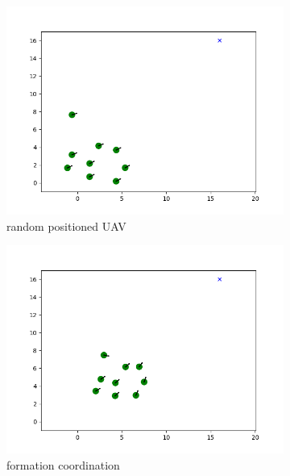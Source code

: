\begin{figure}[htbp]
     \centering
     \begin{subfigure}[b]{0.3\textwidth}
         \centering
         \includegraphics[width=\textwidth]{figures/reconfigure_1.png}
         \caption{random positioned UAV}
         \label{reconfiguring_a}
     \end{subfigure}
     \hfill
     \begin{subfigure}[b]{0.3\textwidth}
         \centering
         \includegraphics[width=\textwidth]{figures/reconfigure_2.png}
         \caption{formation coordination}
         \label{reconfiguring_b}
     \end{subfigure}
     \hfill
     \begin{subfigure}[b]{0.3\textwidth}

\end{subfigure}
\end{figure}
